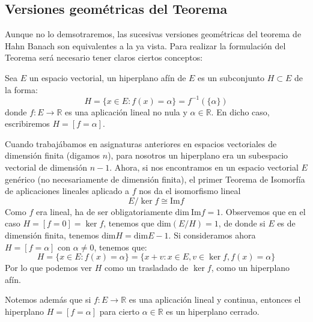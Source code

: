 \subsection{Versiones geométricas del Teorema}
\noindent
Aunque no lo demsotraremos, las sucesivas versiones geométricas del teorema de Hahn Banach son equivalentes a la ya vista. Para realizar la formulación del Teorema será necesario tener claros ciertos conceptos:

\begin{definicion}
    Sea $E$ un espacio vectorial, un hiperplano afín de $E$ es un subconjunto $H\subset E$ de la forma:
    \begin{equation*}
        H = \{x\in E : f(x) = \alpha\} = f^{-1}(\{\alpha\})
    \end{equation*}
    donde $f:E\to \mathbb{R}$ es una aplicación lineal no nula y $\alpha\in \mathbb{R}$. En dicho caso, escribiremos $H = [f=\alpha]$.
\end{definicion}

\begin{observacion}
    Cuando trabajábamos en asignaturas anteriores en espacios vectoriales de dimensión finita (digamos $n$), para nosotros un hiperplano era un subespacio vectorial de dimensión $n-1$. Ahora, si nos encontramos en un espacio vectorial $E$ genérico (no necesariamente de dimensión finita), el primer Teorema de Isomorfía de aplicaciones lineales aplicado a $f$ nos da el isomorfismo lineal
    \begin{equation*}
        E/\ker f \cong \text{Im}f
    \end{equation*}
    Como $f$ era lineal, ha de ser obligatoriamente $\text{dim}\ \text{Im}f = 1$. Observemos que en el caso $H = [f=0] = \ker f$, tenemos que $\text{dim}(E/H) = 1$, de donde si $E$ es de dimensión finita, tenemos $\text{dim}H = \text{dim}E - 1$. Si consideramos ahora $H=[f=\alpha]$ con $\alpha\neq 0$, tenemos que:
    \begin{equation*}
        H = \{x\in E : f(x) = \alpha\} = \{x+v : x\in E, v\in \ker f, f(x) = \alpha\}
    \end{equation*}
    Por lo que podemos ver $H$ como un trasladado de $\ker f$, como un hiperplano afín.
\end{observacion}

\begin{observacion}
    Notemos además que si $f:E\to \mathbb{R}$ es una aplicación lineal y continua, entonces el hiperplano $H = [f=\alpha]$ para cierto $\alpha\in \mathbb{R}$ es un hiperplano cerrado.
\end{observacion}

